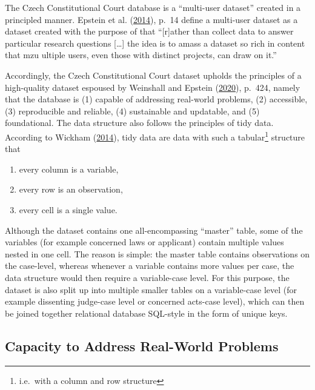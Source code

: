 \documentclass[
  11pt,
]{article}
\providecommand{\tightlist}{%
  \setlength{\itemsep}{0pt}\setlength{\parskip}{0pt}}
\begin{document}
The Czech Constitutional Court database is a ``multi-user dataset''
created in a principled manner. Epstein et al.
(\protect\hyperlink{ref-epsteinIntroductionEmpiricalLegal2014}{2014}),
p.~14 define a multi-user dataset as a dataset created with the purpose
of that ``{[}r{]}ather than collect data to answer particular research
questions {[}\ldots{]} the idea is to amass a dataset so rich in content
that mzu ultiple users, even those with distinct projects, can draw on
it.''

Accordingly, the Czech Constitutional Court dataset upholds the
principles of a high-quality dataset espoused by Weinshall and Epstein
(\protect\hyperlink{ref-weinshallDevelopingHighQualityData2020}{2020}),
p.~424, namely that the database is (1) capable of addressing real-world
problems, (2) accessible, (3) reproducible and reliable, (4) sustainable
and updatable, and (5) foundational. The data structure also follows the
principles of tidy data. According to Wickham
(\protect\hyperlink{ref-wickhamTidyData2014}{2014}), tidy data are data
with such a tabular\footnote{i.e.~with a column and row structure}
structure that

\begin{enumerate}
\def\labelenumi{(\arabic{enumi})}
\tightlist
\item
  every column is a variable,
\item
  every row is an observation,
\item
  every cell is a single value.
\end{enumerate}

Although the dataset contains one all-encompassing ``master'' table,
some of the variables (for example concerned laws or applicant) contain
multiple values nested in one cell. The reason is simple: the master
table contains observations on the case-level, whereas whenever a
variable contains more values per case, the data structure would then
require a variable-case level. For this purpose, the dataset is also
split up into multiple smaller tables on a variable-case level (for
example dissenting judge-case level or concerned acts-case level), which
can then be joined together relational database SQL-style in the form of
unique keys.

\hypertarget{capacity-to-address-real-world-problems}{%
\subsection{Capacity to Address Real-World
Problems}\label{capacity-to-address-real-world-problems}}
\end{document}
